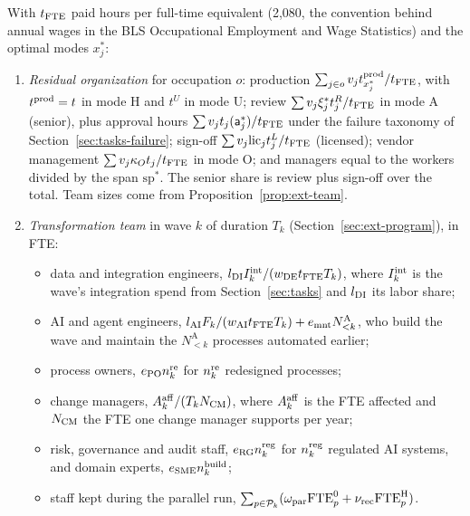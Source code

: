 \begin{definition}\label{def:ext-org}
With $t_{\rm FTE}$ paid hours per full-time equivalent (2,080, the convention behind annual wages in the BLS Occupational Employment and Wage Statistics) and the optimal modes $x^*_j$:
\begin{enumerate}
\item[(i)] \emph{Residual organization} for occupation $o$: production $\sum_{j\in o}v_jt^{\rm prod}_{x^*_j}/t_{\rm FTE}$, with $t^{\rm prod}=t$ in mode H and $t^U$ in mode U; review $\sum v_j\xi^*_jt^R_j/t_{\rm FTE}$ in mode A (senior), plus approval hours $\sum v_jt_j(\mathsf a^*_j)/t_{\rm FTE}$ under the failure taxonomy of Section~\ref{sec:tasks-failure}; sign-off $\sum v_j\mathrm{lic}_jt^L_j/t_{\rm FTE}$ (licensed); vendor management $\sum v_j\kappa_Ot_j/t_{\rm FTE}$ in mode O; and managers equal to the workers divided by the span $\mathrm{sp}^*$. The senior share is review plus sign-off over the total. Team sizes come from Proposition~\ref{prop:ext-team}.
\item[(ii)] \emph{Transformation team} in wave $k$ of duration $T_k$ (Section~\ref{sec:ext-program}), in FTE:
\begin{itemize}
\item data and integration engineers, $l_{\rm DI}I^{\rm int}_k/(w_{\rm DE}t_{\rm FTE}T_k)$, where $I^{\rm int}_k$ is the wave's integration spend from Section~\ref{sec:tasks} and $l_{\rm DI}$ its labor share;
\item AI and agent engineers, $l_{\rm AI}F_k/(w_{\rm AI}t_{\rm FTE}T_k)+e_{\rm mnt}N^{\mathrm A}_{<k}$, who build the wave and maintain the $N^{\mathrm A}_{<k}$ processes automated earlier;
\item process owners, $e_{\rm PO}n^{\rm re}_k$ for $n^{\rm re}_k$ redesigned processes;
\item change managers, $A^{\rm aff}_k/(T_kN_{\rm CM})$, where $A^{\rm aff}_k$ is the FTE affected and $N_{\rm CM}$ the FTE one change manager supports per year;
\item risk, governance and audit staff, $e_{\rm RG}n^{\rm reg}_k$ for $n^{\rm reg}_k$ regulated AI systems, and domain experts, $e_{\rm SME}n^{\rm build}_k$;
\item staff kept during the parallel run, $\sum_{p\in\mathcal P_k}(\omega_{\rm par}\mathrm{FTE}^0_p+\nu_{\rm rec}\mathrm{FTE}^{\mathrm H}_p)$.
\end{itemize}
\end{enumerate}
\end{definition}

